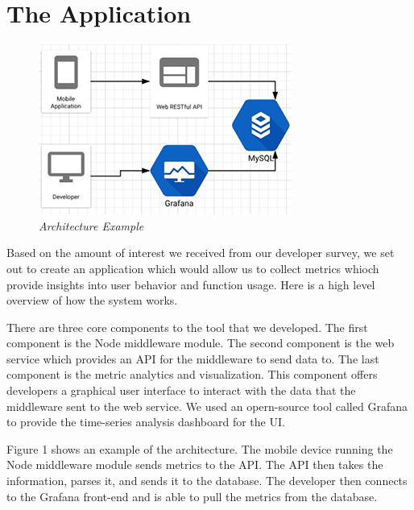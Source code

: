 \section{The Application}
\begin{figure}  
\begin{center}  
\includegraphics[]{arc2.JPG}  
\caption{\small \sl Architecture Example\label{fig:architecture_example}}  
\end{center}  
\end{figure}  

Based on the amount of interest we received from our developer survey, we set out to create an application which would allow us to collect metrics whioch provide insights into user behavior and function usage. Here is a high level overview of how the system works.

There are three core components to the tool that we developed. The first component is the Node middleware module. The second component is the web service which provides an API for the middleware to send data to. The last component is the metric analytics and visualization. This component offers developers a graphical user interface to interact with the data that the middleware sent to the web service. We used an opern-source tool called Grafana to provide the time-series analysis dashboard for the UI.

Figure 1 shows an example of the architecture. The mobile device running the Node middleware module sends metrics to the API. The API then takes the information, parses it, and sends it to the database. The developer then connects to the Grafana front-end and is able to pull the metrics from the database. 

